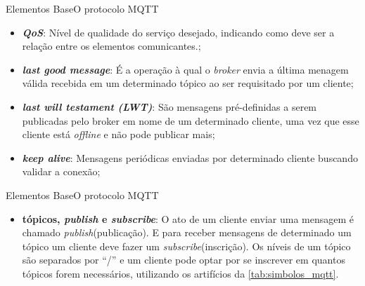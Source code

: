 \begin{frame}{Elementos Base}{O protocolo MQTT}
    \begin{itemize}
        \item  \textit{\textbf{QoS}}: Nível de qualidade do serviço desejado, indicando como deve ser a relação entre os elementos comunicantes.\cite{fabiobrandao};
        \item \textbf{\textit{last good message}}: É a operação à qual o \textit{broker} envia a última menagem válida recebida em um determinado tópico ao ser requisitado por um cliente;
        \item \textbf{\textit{last will testament (LWT)}}: São mensagens pré-definidas a serem publicadas pelo broker em nome de um determinado cliente, uma vez que esse cliente está \textit{offline} e não pode publicar mais;
        \item \textbf{\textit{keep alive}}: Mensagens periódicas enviadas por determinado cliente buscando validar a conexão;
    \end{itemize}

\end{frame}

\begin{frame}{Elementos Base}{O protocolo MQTT}
    \begin{itemize}
        \item \textbf{tópicos, \textit{publish} e \textit{subscribe}}: O ato de um cliente enviar uma mensagem é chamado \textit{publish}(publicação). E para receber mensagens de determinado um tópico um cliente deve fazer um \textit{subscribe}(inscrição). Os níveis de um tópico são separados por “/” e um cliente pode optar por se inscrever em quantos tópicos forem necessários, utilizando os artifícios da \autoref{tab:simbolos_mqtt}.
    \end{itemize}

\end{frame}

